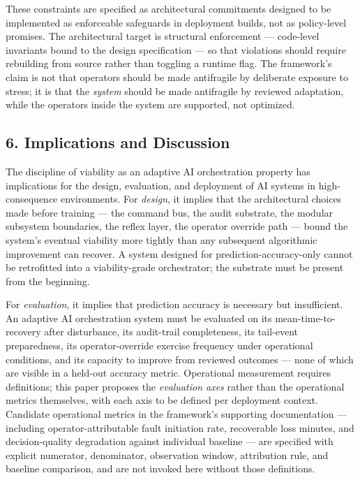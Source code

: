 These constraints are specified as architectural commitments designed to
be implemented as enforceable safeguards in deployment builds, not as
policy-level promises. The architectural target is structural
enforcement --- code-level invariants bound to the design specification
--- so that violations should require rebuilding from source rather than
toggling a runtime flag. The framework's claim is not that operators
should be made antifragile by deliberate exposure to stress; it is that
the \emph{system} should be made antifragile by reviewed adaptation,
while the operators inside the system are supported, not optimized.

\subsection{6. Implications and
Discussion}\label{implications-and-discussion}

The discipline of viability as an adaptive AI orchestration property has
implications for the design, evaluation, and deployment of AI systems in
high-consequence environments. For \emph{design}, it implies that the
architectural choices made before training --- the command bus, the
audit substrate, the modular subsystem boundaries, the reflex layer, the
operator override path --- bound the system's eventual viability more
tightly than any subsequent algorithmic improvement can recover. A
system designed for prediction-accuracy-only cannot be retrofitted into
a viability-grade orchestrator; the substrate must be present from the
beginning.

For \emph{evaluation}, it implies that prediction accuracy is necessary
but insufficient. An adaptive AI orchestration system must be evaluated
on its mean-time-to-recovery after disturbance, its audit-trail
completeness, its tail-event preparedness, its operator-override
exercise frequency under operational conditions, and its capacity to
improve from reviewed outcomes --- none of which are visible in a
held-out accuracy metric. Operational measurement requires definitions;
this paper proposes the \emph{evaluation axes} rather than the
operational metrics themselves, with each axis to be defined per
deployment context. Candidate operational metrics in the framework's
supporting documentation --- including operator-attributable fault
initiation rate, recoverable loss minutes, and decision-quality
degradation against individual baseline --- are specified with explicit
numerator, denominator, observation window, attribution rule, and
baseline comparison, and are not invoked here without those definitions.

